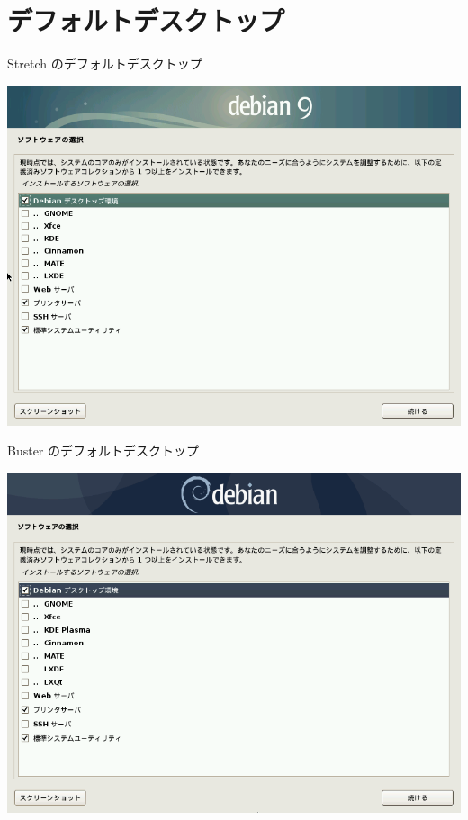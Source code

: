 \frame{\titlepage{}}

\section{デフォルトデスクトップ}
 
\begin{frame}{Stretch のデフォルトデスクトップ}

\begin{center}
\includegraphics[keepaspectratio,width=1\hsize]{image201907/stretch_tasksel_0.png}
\end{center}

\end{frame}

\begin{frame}{Buster のデフォルトデスクトップ}

\begin{center}
\includegraphics[keepaspectratio,width=1\hsize]{image201907/buster_tasksel_0.png}
\end{center}

\end{frame}

